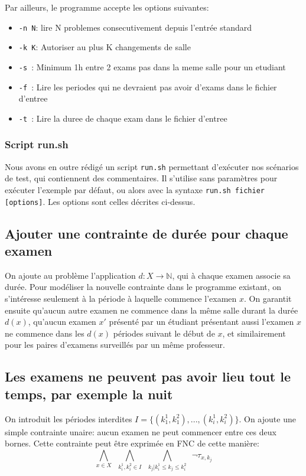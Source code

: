 \documentclass[a4paper]{article}
\begin{document}
Par ailleurs, le programme accepte les options suivantes:
\begin{itemize}
  \item \texttt{-n N}: lire N problemes consecutivement depuis l'entrée standard
  \item \texttt{-k K}: Autoriser au plus K changements de salle
  \item \texttt{-s  }: Minimum 1h entre 2 exams pas dans la meme salle pour un etudiant
  \item \texttt{-f  }: Lire les periodes qui ne devraient pas avoir d'exams dans le fichier d'entree
  \item \texttt{-t  }: Lire la duree de chaque exam dans le fichier d'entree
\end{itemize}

\subsubsection{Script run.sh}
Nous avons en outre rédigé un script \texttt{run.sh} permettant d'exécuter nos
scénarios de test, qui contiennent des commentaires. Il s'utilise sans paramètres
pour exécuter l'exemple par défaut, ou alors avec la  syntaxe \texttt{run.sh fichier [options]}.
Les options sont celles décrites ci-dessus.

\subsection{Ajouter une contrainte de durée pour chaque examen}
On ajoute au problème l'application $ d : X \rightarrow \mathbb{N} $, qui à chaque examen associe
sa durée. Pour modéliser la nouvelle contrainte dans le programme existant, on s'intéresse seulement à la période
à laquelle commence l'examen $x$. On garantit ensuite qu'aucun autre examen ne commence dans la même salle durant
la durée $d(x)$, qu'aucun examen $x'$ présenté par un étudiant présentant aussi l'examen $x$ ne commence dans les
$d(x)$ périodes suivant le début de $x$, et similairement pour les paires d'examens surveillés par un même professeur.

\subsection{Les examens ne peuvent pas avoir lieu tout le temps, par exemple la nuit}
On introduit les périodes interdites $I = \{(k_1^1, k_1^2), ..., (k_{i}^{1},k_{i}^{2})\}$.
On ajoute une simple contrainte unaire: aucun examen ne peut commencer entre ces deux bornes. Cette contrainte peut être exprimée en FNC de cette manière:
$$ \bigwedge\limits_{x \in X} \,\,\,
  \bigwedge\limits_{k_i^1, k_i^2 \in I}\,\,\,
  \bigwedge\limits_{k_j | k_i^1 \leq k_j \leq k_i^2} \,\,\,
  \lnot \tau_{x,k_j}$$
\end{document}

